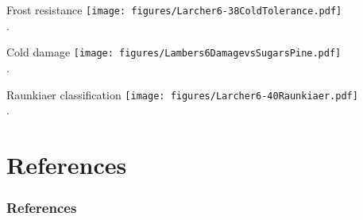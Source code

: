 \documentclass[10pt]{beamer}
\begin{document}
\begin{frame}{Frost resistance}
    \texttt{[image: figures/Larcher6-38ColdTolerance.pdf]}\\
    {\small \autocite[from][]{Larcher2003}.}
\end{frame}

\begin{frame}{Cold damage}
    \centering
    \texttt{[image: figures/Lambers6DamagevsSugarsPine.pdf]}\\
    {\small \autocite[from][]{LambersEtAl1998}.}
\end{frame}

\begin{frame}{Raunkiaer classification}
    \centering
    \texttt{[image: figures/Larcher6-40Raunkiaer.pdf]}\\
    {\small \autocite[from][]{Larcher2003}.}
\end{frame}





  \section*{References}
  \begin{frame}[t,allowframebreaks]
    \frametitle{References}
    \printbibliography
  \end{frame}
\end{document}
